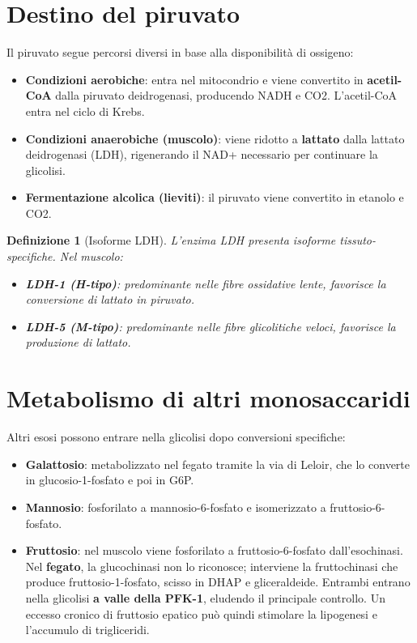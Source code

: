 \documentclass[12pt,a4paper]{report}
\newtheorem{definizione}{Definizione}[section]
\begin{document}
\section{Destino del piruvato}
Il piruvato segue percorsi diversi in base alla disponibilità di ossigeno:
\begin{itemize}
\item \textbf{Condizioni aerobiche}: entra nel mitocondrio e viene convertito in \textbf{acetil-CoA} dalla piruvato deidrogenasi, producendo NADH e CO2. L'acetil-CoA entra nel ciclo di Krebs.
\item \textbf{Condizioni anaerobiche (muscolo)}: viene ridotto a \textbf{lattato} dalla lattato deidrogenasi (LDH), rigenerando il NAD+ necessario per continuare la glicolisi.
\item \textbf{Fermentazione alcolica (lieviti)}: il piruvato viene convertito in etanolo e CO2.
\end{itemize}
\begin{definizione}[Isoforme LDH]
L'enzima LDH presenta isoforme tissuto-specifiche. Nel muscolo:
\begin{itemize}
\item \textbf{LDH-1 (H-tipo)}: predominante nelle fibre ossidative lente, favorisce la conversione di lattato in piruvato.
\item \textbf{LDH-5 (M-tipo)}: predominante nelle fibre glicolitiche veloci, favorisce la produzione di lattato.
\end{itemize}
\end{definizione}

\section{Metabolismo di altri monosaccaridi}
Altri esosi possono entrare nella glicolisi dopo conversioni specifiche:
\begin{itemize}
\item \textbf{Galattosio}: metabolizzato nel fegato tramite la via di Leloir, che lo converte in glucosio-1-fosfato e poi in G6P.
\item \textbf{Mannosio}: fosforilato a mannosio-6-fosfato e isomerizzato a fruttosio-6-fosfato.
\item \textbf{Fruttosio}: nel muscolo viene fosforilato a fruttosio-6-fosfato dall'esochinasi. Nel \textbf{fegato}, la glucochinasi non lo riconosce; interviene la fruttochinasi che produce fruttosio-1-fosfato, scisso in DHAP e gliceraldeide. Entrambi entrano nella glicolisi \textbf{a valle della PFK-1}, eludendo il principale controllo. Un eccesso cronico di fruttosio epatico può quindi stimolare la lipogenesi e l'accumulo di trigliceridi.
\end{itemize}
\end{document}

